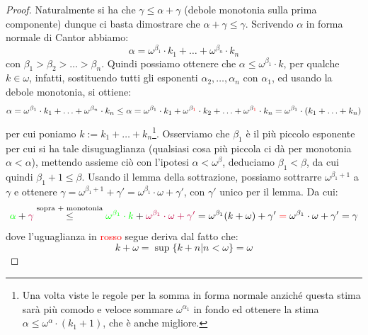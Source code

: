 \begin{proof}
	Naturalmente si ha che $\gamma \leq \alpha + \gamma$ (debole monotonia sulla prima componente) dunque ci basta dimostrare che $\alpha + \gamma \leq \gamma$.
	Scrivendo $\alpha$ in forma normale di Cantor abbiamo:
	\[ \alpha = \omega^{\beta_1} \cdot k_1 + \ldots + \omega^{\beta_n} \cdot k_n
		\]
	con $\beta_1 > \beta_2 > \ldots > \beta_n$. Quindi possiamo ottenere che $\alpha \leq \omega^{\beta_1} \cdot k$, per qualche $k \in \omega$, infatti, sostituendo tutti gli esponenti $\alpha_2,\ldots,\alpha_n$ con $\alpha_1$, ed usando la debole monotonia, si ottiene:
	\[ \alpha = \omega^{\beta_1} \cdot k_1 + \ldots + \omega^{\beta_n} \cdot k_n \leq \alpha = \omega^{\beta_1} \cdot k_1 + \omega^{\beta_{\textcolor{red}{1}}} \cdot k_2 + \ldots + \omega^{\beta_{\textcolor{red}{1}}} \cdot k_n = \omega^{\beta_1}\cdot (k_1 + \ldots + k_n)
		\]
	per cui poniamo $k := k_1 + \ldots + k_n$\footnote{Una volta viste le regole per la somma in forma normale anzich\'e questa stima sar\`a pi\`u comodo e veloce sommare $\omega^{\alpha_1}$ in fondo ed ottenere la stima $\alpha \leq \omega^{\alpha} \cdot (k_1 + 1)$, che \`e anche migliore.}.
	Osserviamo che $\beta_1$ \`e il pi\`u piccolo esponente per cui si ha tale disuguaglianza (qualsiasi cosa pi\`u piccola ci d\`a per monotonia $\alpha < \alpha$), mettendo assieme ci\`o con l'ipotesi $\alpha < \omega^\beta$, deduciamo $\beta_1 < \beta$, da cui
	quindi $\beta_1 + 1 \leq \beta$. Usando il lemma della sottrazione, possiamo sottrarre $\omega^{\beta_1 + 1}$ a $\gamma$ e ottenere $\gamma = \omega^{\beta_1 + 1} + \gamma' = \omega^{\beta_1} \cdot \omega + \gamma'$, con $\gamma'$ unico per il lemma.
	Da cui:
	\[ \textcolor{green}{\alpha} + \textcolor{purple}{\gamma} \overset{\text{sopra + monotonia}}{\leq} \textcolor{green}{\omega^{\beta_1} \cdot k} + \textcolor{purple}{\omega^{\beta_1} \cdot \omega + \gamma'} = \omega^{\beta_1} (k + \omega) + \gamma' \;\textcolor{red}{=}\; \omega^{\beta_1} \cdot \omega + \gamma' = \gamma
		\]
	dove l'uguaglianza in \textcolor{red}{rosso} segue deriva dal fatto che:
	\[ k + \omega = \sup\{k + n | n < \omega\} = \omega
		\]
\end{proof}

